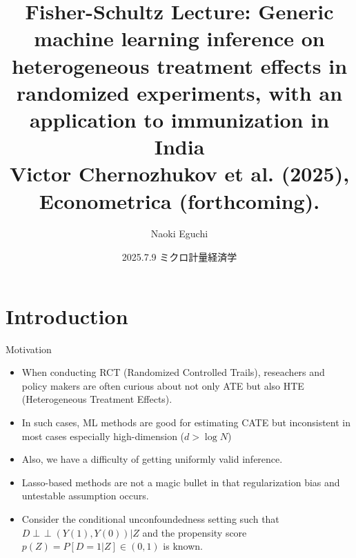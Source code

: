\documentclass[xcolor=svgnames,aspectratio=169]{beamer}
\newcommand{\indep}{\mathop{\perp\!\!\!\!\perp}}
\begin{document}
 

\title{Fisher-Schultz Lecture: Generic machine learning inference on heterogeneous treatment effects in randomized experiments, with an application to immunization in India \\ \small{Victor Chernozhukov et al. (2025), Econometrica (forthcoming).}}
\author{Naoki Eguchi}          
\date{2025.7.9 ミクロ計量経済学}

\begin{frame}                  
    \titlepage                     
\end{frame}

\section{Introduction}

\begin{frame}{Motivation}
    \begin{itemize}
        \item When conducting RCT (Randomized Controlled Trails), reseachers and policy makers are often curious about not only ATE but also HTE (Heterogeneous Treatment Effects).
        \item In such cases, ML methods are good for estimating CATE but inconsistent in most cases especially high-dimension ($d>\log N$)
        \item Also, we have a difficulty of getting uniformly valid inference.
        \item Lasso-based methods are not a magic bullet in that regularization bias and untestable assumption occurs.
        \item Consider the conditional unconfoundedness setting such that $D\indep (Y(1),Y(0))|Z$ and the propensity score $p(Z)=P[D=1|Z]\in (0,1)$ is known.
    \end{itemize}
\end{frame}
\end{document}
